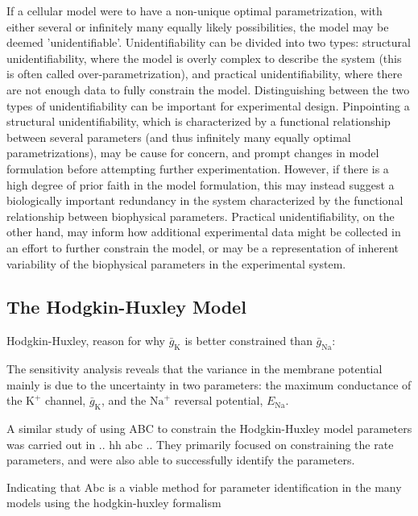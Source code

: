 If a cellular model were to have a non-unique optimal parametrization, with either several or infinitely many equally likely possibilities, the model may be deemed 'unidentifiable'. Unidentifiability can be divided into two types: structural unidentifiability, where the model is overly complex to describe the system (this is often called over-parametrization), and practical unidentifiability, where there are not enough data to fully constrain the model. Distinguishing between the two types of unidentifiability can be important for experimental design. Pinpointing a structural  unidentifiability, which is characterized by a functional relationship between several parameters (and thus infinitely many equally optimal parametrizations), may be cause for concern, and prompt changes in model formulation before attempting further experimentation. However, if there is a high degree of prior faith in the model formulation, this may instead suggest a biologically important redundancy in the system characterized by the functional relationship between biophysical parameters. Practical unidentifiability, on the other hand, may inform how additional experimental data might be collected in an effort to further constrain the model, or may be a representation of inherent variability of the biophysical parameters in the experimental system. 

\subsection{The Hodgkin-Huxley Model}

Hodgkin-Huxley, reason for why $\bar{g}_\mathrm{K}$ is better constrained than $\bar{g}_\mathrm{Na}$:

The sensitivity analysis reveals that the variance in the membrane potential mainly is due to the uncertainty in two parameters: the maximum conductance of the $\mathrm{K}^+$ channel, $\bar{g}_\mathrm{K}$, and the $\mathrm{Na}^+$ reversal potential, $E_\mathrm{Na}$.

A similar study of using ABC to constrain the Hodgkin-Huxley model parameters was carried out in .. hh abc .. They primarily focused on constraining the rate parameters, and were also able to successfully identify the parameters.  

Indicating that Abc is a viable method for parameter identification in the many models using the hodgkin-huxley formalism

